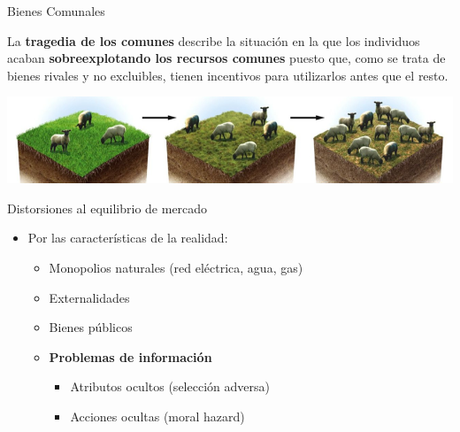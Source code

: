 \documentclass{beamer}
\begin{document}
\begin{frame}{Bienes Comunales}
    \begin{boxB}
        \centering
        La \textbf{tragedia de los comunes} describe la situación en la que los individuos acaban \textbf{sobreexplotando los recursos comunes} puesto que, como se trata de bienes rivales y no excluibles, tienen incentivos para utilizarlos antes que el resto.
    \end{boxB}
    \vspace{5mm}
    \centering
    \includegraphics[scale=0.55]{../Figures/M18.5.png}
\end{frame}

\begin{frame}{Distorsiones al equilibrio de mercado}
    \begin{itemize}
        \item Por las características de la realidad: \vspace{1mm}
        \begin{itemize}
            \item Monopolios naturales (red eléctrica, agua, gas)   
             \vspace{1mm}
            \item Externalidades
             \vspace{1mm}
            \item Bienes públicos
            \vspace{1mm}
            \item \textbf{Problemas de información}
            \begin{itemize}
                \item Atributos ocultos (selección adversa)
                 \vspace{1mm}
                \item Acciones ocultas (moral hazard)
            \end{itemize}        
        \end{itemize}
    \end{itemize}
\end{frame}
\end{document}
